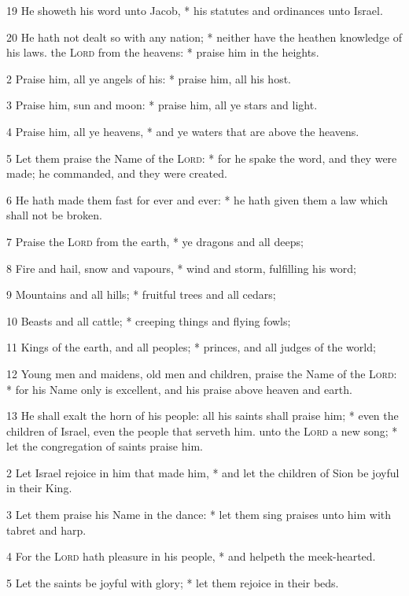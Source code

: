 19 He showeth his word unto Jacob, * his statutes and ordinances unto Israel.\par
20 He hath not dealt so with any nation; * neither have the heathen knowledge of his laws.
 the {\textsc{Lord}} from the heavens: * praise him in the heights.\par
2 Praise him, all ye angels of his: * praise him, all his host.\par
3 Praise him, sun and moon: * praise him, all ye stars and light.\par
4 Praise him, all ye heavens, * and ye waters that are above the heavens.\par
5 Let them praise the Name of the {\textsc{Lord}}: * for he spake the word, and they were made; he commanded, and they were created.\par
6 He hath made them fast for ever and ever: * he hath given them a law which shall not be broken.\par
7 Praise the {\textsc{Lord}} from the earth, * ye dragons and all deeps;\par
8 Fire and hail, snow and vapours, * wind and storm, fulfilling his word;\par
9 Mountains and all hills; * fruitful trees and all cedars;\par
10 Beasts and all cattle; * creeping things and flying fowls;\par
11 Kings of the earth, and all peoples; * princes, and all judges of the world;\par
12 Young men and maidens, old men and children, praise the Name of the {\textsc{Lord}}: * for his Name only is excellent, and his praise above heaven and earth.\par
13 He shall exalt the horn of his people: all his saints shall praise him; * even the children of Israel, even the people that serveth him.
 unto the {\textsc{Lord}} a new song; * let the congregation of saints praise him.\par
2 Let Israel rejoice in him that made him, * and let the children of Sion be joyful in their King.\par
3 Let them praise his Name in the dance: * let them sing praises unto him with tabret and harp.\par
4 For the {\textsc{Lord}} hath pleasure in his people, * and helpeth the meek-hearted.\par
5 Let the saints be joyful with glory; * let them rejoice in their beds.\par
